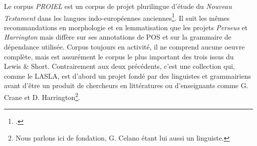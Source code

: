 Le corpus \textit{PROIEL} est un corpus de projet plurilingue d'étude du \textit{Nouveau Testament} dans les langues indo-européennes anciennes\footcite{haug_creating_2008}. Il suit les mêmes recommandations en morphologie et en lemmatisation que les projets \textit{Perseus} et \textit{Harrington} mais diffère sur ses annotations de POS et sur la grammaire de dépendance utilisée. Corpus toujours en activité, il ne comprend aucune oeuvre complète, mais est assurément le corpus le plus important des trois issus du Lewis \& Short. Contrairement aux deux précédents, c'est une collection qui, comme le LASLA, est d'abord un projet fondé par des linguistes et grammairiens avant d'être un produit de chercheurs en littératures ou d'enseignants comme G. Crane et D. Harrington\footnote{Nous parlons ici de fondation, G. Celano étant lui aussi un linguiste.}.

\begin{table}[h]
\centering
{}
\caption{Résumé des informations sur les quatre corpus disponibles. Il existe 137 oeuvres au sens du LASLA, mais certaines sont des des découpes inhabituelles, nous préférons donc la notation 100+ ici.}
\label{tab:lemmatisation:corpus-entrainement}
\end{table}

